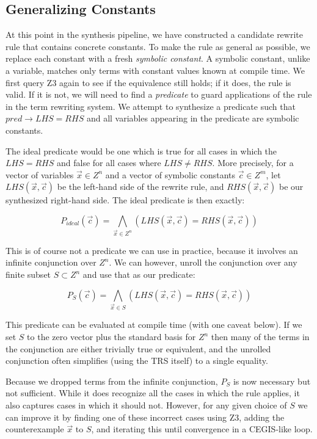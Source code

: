 \documentclass[acmsmall,review,anonymous]{acmart}\settopmatter{printfolios=true,printccs=false,printacmref=false}
\begin{document}
\subsection{Generalizing Constants}

At this point in the synthesis pipeline, we have constructed a candidate rewrite
rule that contains concrete constants.  To make the rule as general as possible,
we replace each constant with a fresh \emph{symbolic constant}. A symbolic constant, unlike a variable,
 matches only terms with constant values known at compile time. We first query Z3
again to see if the equivalence still holds; if it does, the rule is valid. If
it is not, we will need to find a \textit{predicate} to guard
applications of the rule in the term rewriting system. We attempt to synthesize a predicate
such that $pred \rightarrow LHS = RHS$ and all variables appearing in the
predicate are symbolic constants.

The ideal predicate would be one which is true for all cases in which
the $LHS = RHS$ and false for all cases where $LHS \neq RHS$. More
precisely, for a vector of variables $\vec{x} \in Z^n$ and a vector of
symbolic constants $\vec{c} \in Z^m$, let $LHS(\vec{x}, \vec{c})$ be the left-hand side
of the rewrite rule, and $RHS(\vec{x}, \vec{c})$ be our synthesized
right-hand side. The ideal predicate is then exactly:

\[
P_{ideal}(\vec{c}) = \bigwedge\limits_{\vec{x} \in Z^n} ( LHS(\vec{x}, \vec{c}) = RHS(\vec{x}, \vec{c}) )
\]

This is of course not a predicate we can use in practice, because it
involves an infinite conjunction over $Z^n$. We can however, unroll
the conjunction over any finite subset $S \subset Z^n$ and use that as
our predicate:

\[
P_S(\vec{c}) = \bigwedge\limits_{\vec{x} \in S} ( LHS(\vec{x}, \vec{c}) = RHS(\vec{x}, \vec{c}) )
\]

This predicate can be evaluated at compile time (with one caveat
below). If we set $S$ to the zero vector plus the standard basis for
$Z^n$ then many of the terms in the conjunction are either trivially
true or equivalent, and the unrolled conjunction often simplifies
(using the TRS itself) to a single equality.

Because we dropped terms from the infinite conjunction, $P_S$
is now necessary but not sufficient. While it does recognize all the
cases in which the rule applies, it also captures cases in which it
should not. However, for any given choice of $S$ we can improve it by
finding one of these incorrect cases using Z3, adding the
counterexample $\vec{x}$ to $S$, and iterating this until convergence in a
CEGIS-like loop.
\end{document}
